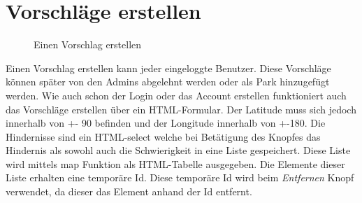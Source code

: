 \section{Vorschläge erstellen}
\label{vorschläge}

\begin{figure}[H]
    \begin{center}
      \caption{Einen Vorschlag erstellen}
    \end{center}
\end{figure}

Einen Vorschlag erstellen kann jeder eingeloggte Benutzer. Diese Vorschläge können später von den 
Admins abgelehnt werden oder als Park hinzugefügt werden. Wie auch schon der Login oder das Account 
erstellen funktioniert auch das Vorschläge erstellen über ein HTML-Formular. Der Latitude muss sich 
jedoch innerhalb von +- 90 befinden und der Longitude innerhalb von +-180. Die Hindernisse sind
ein HTML-select welche bei Betätigung des Knopfes das Hindernis als sowohl auch die Schwierigkeit 
in eine Liste gespeichert. Diese Liste wird mittels map Funktion als HTML-Tabelle ausgegeben. Die 
Elemente dieser Liste erhalten eine temporäre Id. Diese temporäre Id wird beim \textit{Entfernen} 
Knopf verwendet, da dieser das Element anhand der Id entfernt. 